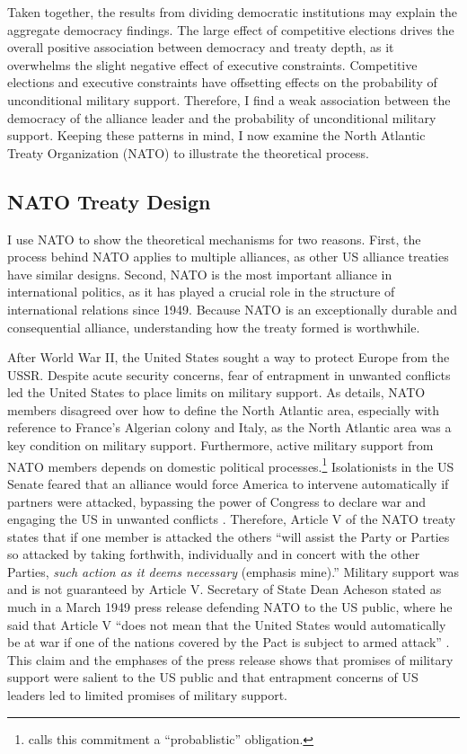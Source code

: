 \documentclass[12pt]{article}
\begin{document}
Taken together, the results from dividing democratic institutions may explain the aggregate democracy findings. 
The large effect of competitive elections drives the overall positive association between democracy and treaty depth, as it overwhelms the slight negative effect of executive constraints. 
Competitive elections and executive constraints have offsetting effects on the probability of unconditional military support. 
Therefore, I find a weak association between the democracy of the alliance leader and the probability of unconditional military support. 
Keeping these patterns in mind, I now examine the North Atlantic Treaty Organization (NATO) to illustrate the theoretical process. 


\subsection{NATO Treaty Design}


I use NATO to show the theoretical mechanisms for two reasons. 
First, the process behind NATO applies to multiple alliances, as other US alliance treaties have similar designs. 
Second, NATO is the most important alliance in international politics, as it has played a crucial role in the structure of international relations since 1949. 
Because NATO is an exceptionally durable and consequential alliance, understanding how the treaty formed is worthwhile. 


After World War II, the United States sought a way to protect Europe from the USSR. 
Despite acute security concerns, fear of entrapment in unwanted conflicts led the United States to place limits on military support. 
As \citet{Poast2019a} details, NATO members disagreed over how to define the North Atlantic area, especially with reference to France's Algerian colony and Italy, as the North Atlantic area was a key condition on military support. 
Furthermore, active military support from NATO members depends on domestic political processes.\footnote{\citet{Benson2012} calls this commitment a ``probablistic'' obligation.} 
Isolationists in the US Senate feared that an alliance would force America to intervene automatically if partners were attacked, bypassing the power of Congress to declare war and engaging the US in unwanted conflicts \citep[pg. 280-1]{Acheson1969}.
Therefore, Article V of the NATO treaty states that if one member is attacked the others ``will assist the Party or Parties so attacked by taking forthwith, individually and in concert with the other Parties, \emph{such action as it deems necessary} (emphasis mine).'' 
Military support was and is not guaranteed by Article V. 
Secretary of State Dean Acheson stated as much in a March 1949 press release defending NATO to the US public, where he said that Article V ``does not mean that the United States would automatically be at war if one of the nations covered by the Pact is subject to armed attack'' \citep{Acheson1949}.
This claim and the emphases of the press release shows that promises of military support were salient to the US public and that entrapment concerns of US leaders led to limited promises of military support. 
\end{document}
